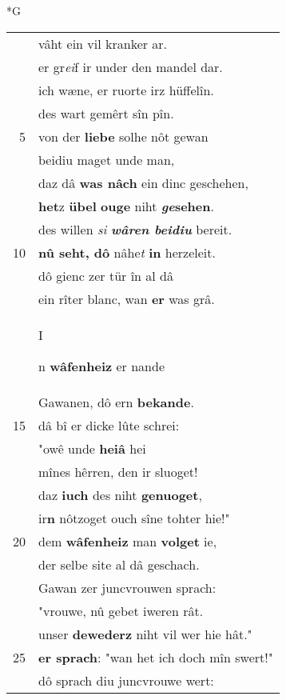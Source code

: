 \documentclass[8pt,a4paper,notitlepage]{article}
\begin{document}
\newpage
\begin{table}[ht]
\begin{minipage}[t]{0.5\linewidth}
\small
\begin{center}*G
\end{center}
\begin{tabular}{rl}
 & vâht ein vil kranker ar.\\ 
 & er gr\textit{ei}f ir under den mandel dar.\\ 
 & ich wæne, er ruorte irz hüffelîn.\\ 
 & des wart gemêrt sîn pîn.\\ 
5 & von der \textbf{liebe} solhe nôt gewan\\ 
 & beidiu maget unde man,\\ 
 & daz dâ \textbf{was nâch} ein dinc geschehen,\\ 
 & \textbf{het}z \textbf{übel} \textbf{ouge} niht \textbf{\textit{ge}sehen}.\\ 
 & des willen \textit{si} \textit{\textbf{wâren beidiu}} bereit.\\ 
10 & \textbf{nû seht, dô} nâhe\textit{t} \textbf{in} herzeleit.\\ 
 & dô gienc zer tür în al dâ\\ 
 & ein rîter blanc, wan \textbf{er} was grâ.\\ 
 & \begin{large}I\end{large}n \textbf{wâfenheiz} er nande\\ 
 & Gawanen, dô ern \textbf{bekande}.\\ 
15 & dâ bî er dicke lûte schrei:\\ 
 & "owê unde \textbf{heiâ} hei\\ 
 & mînes hêrren, den ir sluoget!\\ 
 & daz \textbf{iuch} des niht \textbf{genuoget},\\ 
 & ir\textbf{n} nôtzoget ouch sîne tohter hie!"\\ 
20 & dem \textbf{wâfenheiz} man \textbf{volget} ie,\\ 
 & der selbe site al dâ geschach.\\ 
 & Gawan zer juncvrouwen sprach:\\ 
 & "vrouwe, nû gebet iweren rât.\\ 
 & unser \textbf{dewederz} niht vil wer hie hât."\\ 
25 & \textbf{er sprach}: "wan het ich doch mîn swert!"\\ 
 & dô sprach diu juncvrouwe wert:\\ 

\end{tabular}
\end{minipage}
\end{table}
\end{document}
